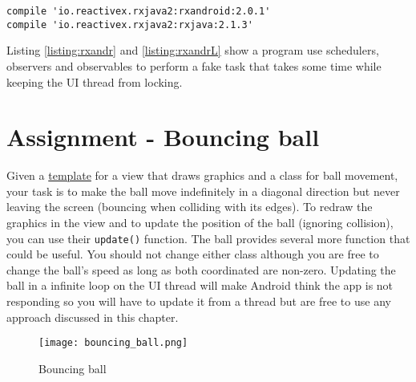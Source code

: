 \begin{lstlisting}[style=A_txt]
compile 'io.reactivex.rxjava2:rxandroid:2.0.1'
compile 'io.reactivex.rxjava2:rxjava:2.1.3'
\end{lstlisting}

Listing \ref{listing:rxandr} and \ref{listing:rxandrL} show a program use schedulers, observers and observables to perform a fake task that takes some time while keeping the UI thread from locking. 

\section{Assignment - Bouncing ball}
\begin{minipage}{0.4\textwidth}
Given a \href{https://github.com/JonSteinn/AndroidDevelopment/tree/master/templates/lab2}{template} for a view that draws graphics and a class for ball movement, your task is to make the ball move indefinitely in a diagonal direction but never leaving the screen (bouncing when colliding with its edges). To redraw the graphics in the view and to update the position of the ball (ignoring collision), you can use their \texttt{update()} function. The ball provides several more function that could be useful. You should not change either class although you are free to change the ball's speed as long as both coordinated are non-zero. Updating the ball in a infinite loop on the UI thread will make Android think the app is not responding so you will have to update it from a thread but are free to use any approach discussed in this chapter.
\end{minipage}
\hspace{2cm}
\begin{minipage}{0.4\textwidth}
\begin{figure}[H]
\centering
\texttt{[image: bouncing\_ball.png]}
\caption{Bouncing ball}
\label{fig:bball}
\end{figure}
\end{minipage}
